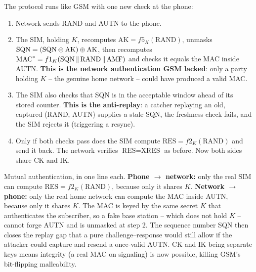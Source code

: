 The protocol runs like GSM with one new check at the phone:

\begin{enumerate}
  \item Network sends RAND and AUTN to the phone.
  \item The SIM, holding $K$, recomputes $\text{AK}=f5_K(\text{RAND})$, unmasks $\text{SQN} = (\text{SQN}\oplus\text{AK})\oplus\text{AK}$, then recomputes $\text{MAC}^\ast = f1_K(\text{SQN}\,\|\,\text{RAND}\,\|\,\text{AMF})$ and checks it equals the MAC inside AUTN. \textbf{This is the network authentication GSM lacked}: only a party holding $K$ -- the genuine home network -- could have produced a valid MAC.
  \item The SIM also checks that SQN is in the acceptable window ahead of its stored counter. \textbf{This is the anti-replay}: a catcher replaying an old, captured (RAND, AUTN) supplies a stale SQN, the freshness check fails, and the SIM rejects it (triggering a resync).
  \item Only if both checks pass does the SIM compute $\text{RES}=f2_K(\text{RAND})$ and send it back. The network verifies $\text{RES}=\text{XRES}$ as before. Now both sides share CK and IK.
\end{enumerate}

\begin{whybox}
Mutual authentication, in one line each. \textbf{Phone $\to$ network:} only the real SIM can compute $\text{RES}=f2_K(\text{RAND})$, because only it shares $K$. \textbf{Network $\to$ phone:} only the real home network can compute the MAC inside AUTN, because only it shares $K$. The MAC is keyed by the same secret $K$ that authenticates the subscriber, so a fake base station -- which does not hold $K$ -- cannot forge AUTN and is unmasked at step 2. The sequence number SQN then closes the replay gap that a pure challenge--response would still allow if the attacker could capture and resend a once-valid AUTN. CK and IK being separate keys means integrity (a real MAC on signaling) is now possible, killing GSM's bit-flipping malleability.
\end{whybox}

